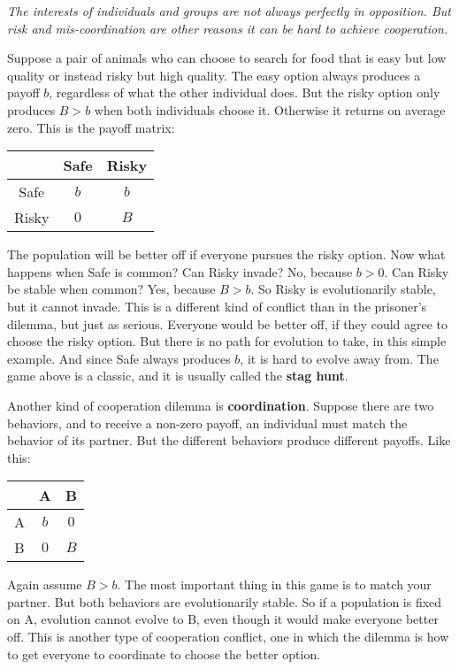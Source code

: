 \documentclass[10pt,reqno]{amsbook}
\newcommand{\bemph}[1]{{\textbf{\textcolor{bemphcol}{#1}}}}
\numberwithin{equation}{chapter}
\newenvironment{precis}
{\noi\itshape}
{\vspace{6pt}}
\newcommand{\noi}{\noindent}
\begin{document}
\begin{precis}The interests of individuals and groups are not always perfectly in opposition. But risk and mis-coordination are other reasons it can be hard to achieve cooperation.\end{precis}

Suppose a pair of animals who can choose to search for food that is easy but low quality or instead risky but high quality. The easy option always produces a payoff $b$, regardless of what the other individual does. But the risky option only produces $B>b$ when both individuals choose it. Otherwise it returns on average zero. This is the payoff matrix:
\begin{center}
	\begin{tabular}{c|cc}
		& Safe & Risky \\
		\hline
	Safe & $b$ & $b$ \\
	Risky & $0$ & $B$ 
	\end{tabular}
\end{center}
The population will be better off if everyone pursues the risky option. Now what happens when Safe is common? Can Risky invade? No, because $b>0$. Can Risky be stable when common? Yes, because $B>b$. So Risky is evolutionarily stable, but it cannot invade. This is a different kind of conflict than in the prisoner's dilemma, but just as serious. Everyone would be better off, if they could agree to choose the risky option. But there is no path for evolution to take, in this simple example. And since Safe always produces $b$, it is hard to evolve away from. The game above is a classic, and it is usually called the \bemph{stag hunt}.

Another kind of cooperation dilemma is \bemph{coordination}. Suppose there are two behaviors, and to receive a non-zero payoff, an individual must match the behavior of its partner. But the different behaviors produce different payoffs. Like this:
\begin{center}
	\begin{tabular}{c|cc}
		& A & B \\
		\hline
	A & $b$ & $0$ \\
	B & $0$ & $B$ 
	\end{tabular}
\end{center}
Again assume $B>b$. The most important thing in this game is to match your partner. But both behaviors are evolutionarily stable. So if a population is fixed on A, evolution cannot evolve to B, even though it would make everyone better off. This is another type of cooperation conflict, one in which the dilemma is how to get everyone to coordinate to choose the better option.
\end{document}
